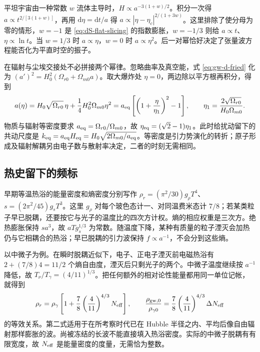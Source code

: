 平坦宇宙由一种常数 $w$ 流体主导时，$H\propto a^{-3(1+w)/2}$。积分一次得 $a\propto t^{2/[3(1+w)]}$，再用 $\mathrm d\eta=\mathrm dt/a$ 得 $a\propto |\eta-\eta_c|^{2/(1+3w)}$。这里排除了使分母为零的情形，$w=-1$ 是 \eqref{eq:dS-flat-slicing} 的指数膨胀，$w=-1/3$ 则给 $a\propto t$、$\eta\propto\ln t$。当 $w=1/3$ 时 $a\propto\eta$，$w=0$ 时 $a\propto\eta^2$。后一对幂恰好决定了张量波方程能否化为平直时空的振子。

在辐射与尘埃交接处不必拼接两个幂律。忽略曲率及真空能，式 \eqref{eq:gw-d-fried} 化为 $(a')^2=H_0^2(\Omega_{r0}+\Omega_{m0}a)$。取大爆炸处 $\eta=0$，两边除以平方根再积分，得到
\begin{equation}\label{eq:gw-d-equality}
 a(\eta)=H_0\sqrt{\Omega_{r0}}\,\eta+\frac14 H_0^2\Omega_{m0}\eta^2
 =a_{\rm eq}\left[\left(1+\frac{\eta}{\eta_1}\right)^2-1\right],
 \qquad \eta_1=\frac{2\sqrt{\Omega_{r0}}}{H_0\Omega_{m0}} .
\end{equation}
物质与辐射等密度要求 $a_{\rm eq}=\Omega_{r0}/\Omega_{m0}$，故 $\eta_{\rm eq}=(\sqrt2-1)\eta_1$。此时给扰动留下的共动尺度是 $k_{\rm eq}=a_{\rm eq}H_{\rm eq}=H_0\sqrt{2\Omega_{m0}/a_{\rm eq}}$。等密度是引力势演化的转折；原子形成及辐射解耦另由电子数与散射率决定，二者的时刻无需相同。

\subsection{热史留下的频标}

早期等温热浴的能量密度和熵密度分别写作 $\rho_r=(\pi^2/30)g_\rho T^4$、$s=(2\pi^2/45)g_sT^3$。这里 $g_\rho$ 对每个玻色态计一、对同温费米态计 $7/8$；若某类粒子早已脱耦，还要按它与光子的温度比的四次方计权。熵的相应权重是三次方。绝热膨胀保持 $sa^3$，故 $aTg_s^{1/3}$ 为常数。随温度下降，某种有质量的粒子湮灭会加热仍与它相耦合的热浴；早已脱耦的引力波保持 $f\propto a^{-1}$，不会分到这些熵。

以中微子为例。在瞬时脱耦近似下，电子、正电子湮灭前电磁热浴有 $2+(7/8)4=11/2$ 个熵自由度，湮灭后只剩光子的两个。中微子温度继续按 $a^{-1}$ 降低，故 $T_\nu/T_\gamma=(4/11)^{1/3}$。把任何额外的相对论性能量都用同一单位记帐，就得到
\begin{equation}\label{eq:gw-d-neff}
 \rho_r=\rho_\gamma\left[1+\frac78\left(\frac4{11}\right)^{4/3}N_{\rm eff}\right],
 \qquad
 \frac{\rho_{{\rm gw},0}}{\rho_{\gamma0}}
 =\frac78\left(\frac4{11}\right)^{4/3}\Delta N_{\rm eff}
\end{equation}
的等效关系。第二式适用于在所考察时代已在 Hubble 半径之内、平均后像自由辐射那样膨胀的波。尚被冻结的长波不能直接填入热浴密度。实际的中微子脱耦有有限宽度，故 $N_{\rm eff}$ 是能量密度的度量，无需恰为整数。

